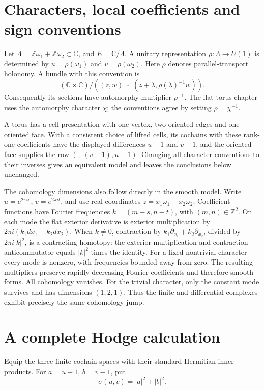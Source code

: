 \section{Characters, local coefficients and sign conventions}

Let $\Lambda=\mathbb Z\omega_1+\mathbb Z\omega_2\subset\mathbb C$,
and $E=\mathbb C/\Lambda$.  A unitary representation
$\rho:\Lambda\to U(1)$ is determined by
$u=\rho(\omega_1)$ and $v=\rho(\omega_2)$.  Here $\rho$ denotes
parallel-transport holonomy.  A bundle with this convention is
\[
 (\mathbb C\times\mathbb C)/
 ((z,w)\sim(z+\lambda,\rho(\lambda)^{-1}w)).
\]
Consequently its sections have automorphy multiplier $\rho^{-1}$.
The flat-torus chapter uses the automorphy character $\chi$;
the conventions agree by setting $\rho=\chi^{-1}$.

A torus has a cell presentation with one vertex, two oriented edges and
one oriented face.  With a consistent choice of lifted cells, its cochains
with these rank-one coefficients have the displayed differences $u-1$
and $v-1$, and the oriented face supplies the row $(-(v-1),u-1)$.
Changing all character conventions to their inverses gives an equivalent
model and leaves the conclusions below unchanged.

The cohomology dimensions also follow directly in the smooth model.
Write $u=e^{2\pi is}$, $v=e^{2\pi it}$, and use real coordinates
$z=x_1\omega_1+x_2\omega_2$.  Coefficient functions have Fourier
frequencies $k=(m-s,n-t)$, with $(m,n)\in\mathbb Z^2$.  On each
mode the flat exterior derivative is exterior multiplication by
$2\pi i(k_1dx_1+k_2dx_2)$.  When $k\ne0$, contraction by
$k_1\partial_{x_1}+k_2\partial_{x_2}$, divided by
$2\pi i|k|^2$, is a contracting homotopy: the exterior multiplication
and contraction anticommutator equals $|k|^2$ times the identity.
For a fixed nontrivial character every mode is nonzero, with frequencies
bounded away from zero.  The resulting multipliers preserve rapidly
decreasing Fourier coefficients and therefore smooth forms.  All
cohomology vanishes.  For the trivial character, only the constant mode
survives and has dimensions $(1,2,1)$.  Thus the finite and differential
complexes exhibit precisely the same cohomology jump.

\section{A complete Hodge calculation}

Equip the three finite cochain spaces with their standard Hermitian inner
products.  For $a=u-1$, $b=v-1$, put
\[
 \sigma(u,v)=|a|^2+|b|^2.
\]

